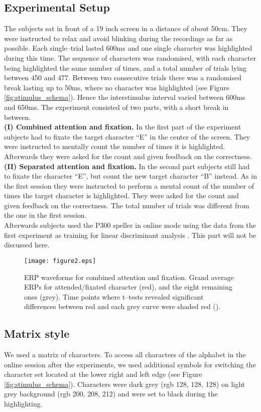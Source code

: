 \documentclass[a4paper,twocolumn]{article}
\begin{document}
\subsection*{Experimental Setup}
The subjects sat in front of a 19 inch screen in a distance of about 50cm. They were instructed to relax and avoid blinking during the recordings as far as possible. Each single--trial lasted 600ms and one single character was highlighted during this time. The sequence of characters was randomised, with each character being highlighted the same number of times, and a total number of trials lying between 450 and 477. Between two consecutive trials there was a randomised break lasting up to 50ms, where no character was highlighted (see Figure \ref{fig:stimulus_schema}). Hence the interstimulus interval varied between 600ms and 650ms. The experiment consisted of two parts, with a short break in between. \\ 
\textbf{(I) Combined attention and fixation.} In the first part of the experiment subjects had to fixate the target character ``E'' in the center of the screen. They were instructed to mentally count the number of times it is highlighted. Afterwards they were asked for the count and given feedback on the correctness.\\
 \textbf{(II) Separated attention and fixation.} In the second part subjects still had to fixate the character ``E'', but count the new target character ``B'' instead. As in the first session they were instructed to perform a mental count of the number of times the target character is highlighted. They were asked for the count and given feedback on the correctness. The total number of trials was different from the one in the first session.\\ 
Afterwards subjects used the P300 speller in online mode using the data from the first experiment as training for linear discriminant analysis \cite{Bandt2009}. This part will not be discussed here.
\begin{figure*}[t!!]
\begin{center}
\texttt{[image: figure2.eps]}
\end{center}
\caption{{ERP waveforms for combined attention and fixation.} Grand average ERPs for attended/fixated character (red), and the eight remaining ones (grey). Time points where t--tests revealed significant differences between red and each grey curve were shaded red ().}
\label{fig:grandaverage_part1}
\end{figure*} 
\subsection*{Matrix style}
We used a  matrix of characters. To access all characters of the alphabet in the online session after the experiments, we used additional symbols for switching the character set located at the lower right and left edge (see Figure \ref{fig:stimulus_schema}).
Characters were dark grey (rgb 128, 128, 128) on light grey background (rgb 200, 208, 212) and were set to black during the highlighting.
\end{document}
